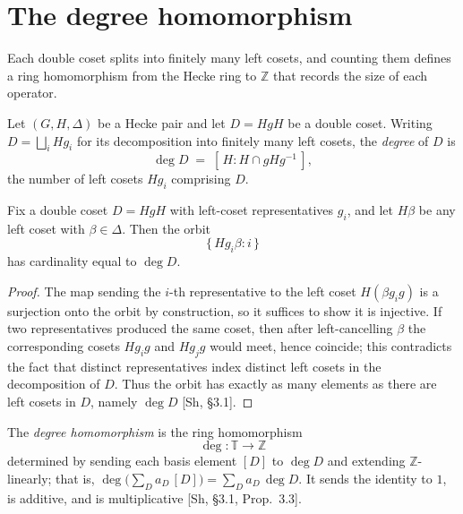 \chapter{The degree homomorphism}\label{chap:degree}

Each double coset splits into finitely many left cosets, and counting them defines a ring
homomorphism from the Hecke ring to $\mathbb{Z}$ that records the size of each operator.

\begin{definition}\label{def:hecke-coset-deg}
\leanok
{}
Let $(G,H,\Delta)$ be a Hecke pair and let $D=HgH$ be a double coset. Writing
$D=\bigsqcup_i Hg_i$ for its decomposition into finitely many left cosets, the
\emph{degree} of $D$ is
\[
  \deg D \;=\; [\,H : H\cap gHg^{-1}\,],
\]
the number of left cosets $Hg_i$ comprising $D$.
\end{definition}

\begin{lemma}\label{lem:smulOrbit-card}
\leanok
{}
Fix a double coset $D=HgH$ with left-coset representatives $g_i$, and let $H\beta$ be any
left coset with $\beta\in\Delta$. Then the orbit
\[
  \{\,Hg_i\beta : i\,\}
\]
has cardinality equal to $\deg D$.
\end{lemma}

\begin{proof}\leanok
{}
The map sending the $i$-th representative to the left coset $H(\beta g_i g)$ is a
surjection onto the orbit by construction, so it suffices to show it is injective. If two
representatives produced the same coset, then after left-cancelling $\beta$ the
corresponding cosets $Hg_i g$ and $Hg_j g$ would meet, hence coincide; this contradicts
the fact that distinct representatives index distinct left cosets in the decomposition of
$D$. Thus the orbit has exactly as many elements as there are left cosets in $D$, namely
$\deg D$ [Sh, \S3.1].
\end{proof}

\begin{definition}\label{def:deg}
\leanok
{}
The \emph{degree homomorphism} is the ring homomorphism
\[
  \deg : \mathbb{T} \longrightarrow \mathbb{Z}
\]
determined by sending each basis element $[D]$ to $\deg D$ and extending
$\mathbb{Z}$-linearly; that is, $\deg\bigl(\sum_D a_D\,[D]\bigr)=\sum_D a_D\,\deg D$. It
sends the identity to $1$, is additive, and is multiplicative
[Sh, \S3.1, Prop.~3.3].
\end{definition}

